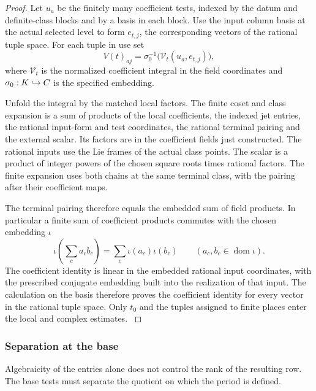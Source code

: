 \begin{proof}

Let \(u_a\) be the finitely many coefficient tests, indexed
by the datum and definite-class blocks and by a basis in each
block. Use the input column basis at the actual selected level
to form \(e_{t,j}\), the corresponding vectors of the rational
tuple space. For each tuple in use set
\[
    V(t)_{aj}=\sigma_0^{-1}
        \bigl(\mathcal V_t(u_a,e_{t,j})\bigr),
\]
where \(\mathcal V_t\) is the normalized coefficient integral in
the field coordinates and \(\sigma_0:K\hookrightarrow C\) is the
specified embedding.

Unfold the integral by the matched local factors. The
finite coset and class expansion is a sum of products of the
local coefficients, the indexed jet entries, the rational
input-form and test coordinates, the rational terminal pairing
and the external scalar. Its factors are in the coefficient fields just constructed. The rational inputs use the Lie frames of
the actual class points. The scalar is a product of integer
powers of the chosen square roots times rational factors.
The finite expansion uses both chains at the same terminal
class, with the pairing after their coefficient maps.

The terminal pairing therefore equals the embedded sum of field products.
In particular a finite sum of coefficient products commutes with the chosen embedding \(\iota\)
\[
  \iota\!\left(\sum_c a_c b_c\right)=\sum_c \iota(a_c)\iota(b_c)\qquad(a_c,b_c\in\operatorname{dom}\iota).
\]
 The
coefficient identity is linear in the embedded rational input
coordinates, with the prescribed conjugate embedding built into
the realization of that input. The calculation on the basis
therefore proves the coefficient identity for every vector in
the rational tuple space. Only \(t_0\) and the tuples assigned to
finite places enter the local and complex estimates.
\label{cor:fitted-evaluation-2}

\end{proof}

\subsubsection{Separation at the base}

Algebraicity of the entries alone does not control the rank of the resulting row. The base tests must separate the quotient on which the period is defined.


